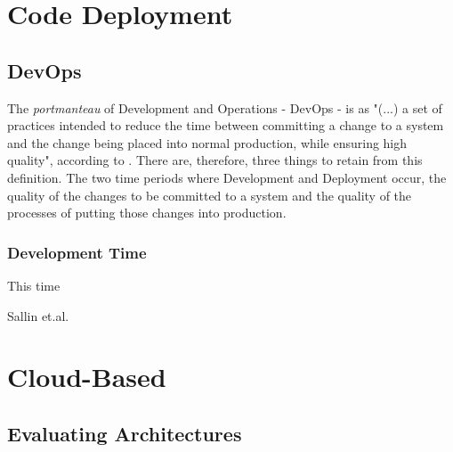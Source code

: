 \section{Code Deployment}\label{state-of-the-art:s:code-deployment}

\subsection{DevOps}\label{state-of-the-art:ss:devops}

The \textit{portmanteau} of Development and Operations - DevOps - is as "(...) a set of practices intended to reduce the time between committing a change to a system and the change being placed into normal production, while ensuring high quality", according to \parencite{bass_weber_zhu_2015}. There are, therefore, three things to retain from this definition. The two time periods where Development and Deployment occur, the quality of the changes to be committed to a system and the quality of the processes of putting those changes into production.

\subsubsection{Development Time}
This time 






Sallin et.al. \parencite{sallin_kropp_anslow_quilty_meier_2021}

\section{Cloud-Based}\label{state-of-the-art:s:cloud-based}

\subsection{Evaluating Architectures}\label{state-of-the-art:ss:evaluating-architectures}